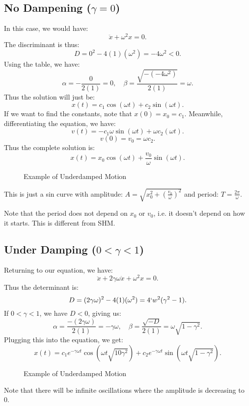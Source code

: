 \documentclass[../main/main.tex]{subfiles}
\begin{document}
\subsection{No Dampening ($\gamma=0$)} 
In this case, we would have: \[
	\ddot{x}+\omega^2x=0
.\] The discriminant is thus: \[
D=0^2-4(1)(\omega^2)=-4\omega^2<0
.\] Using the table, we have: \[
\alpha=-\frac{0}{2(1)}=0, \quad\beta = \frac{\sqrt{-(-4\omega^2)}}{2(1)} = \omega
.\] Thus the solution will just be: \[
x(t) = c_1\cos(\omega t)+c_2\sin(\omega t)
.\] If we want to find the constants, note that $x(0)=x_0=c_1$. Meanwhile, differentiating the equation, we have: \[
v(t) = -c_1\omega\sin(\omega t)+\omega c_2(\omega t) 
.\] \[
v(0)=v_0=\omega c_2
.\] Thus the complete solution is: \[
x(t) = x_0 \cos(\omega t) + \frac{v_0}{\omega}\sin(\omega t)
.\] 
\begin{figure}[h!]
	\centering
	\caption{ Example of Underdamped Motion}
	\label{fig:}
\end{figure}
This is just a sin curve with amplitude: $A=\sqrt{x_0^2+\left( \frac{v_0}{\omega} \right) ^2} $ and period: $T=\frac{2\pi}{\omega}$.
\begin{remark}
	Note that the period does not depend on $x_0$ or $v_0$, i.e. it doesn't depend on how it starts. This is different from SHM.
\end{remark}
\subsection{Under Damping ($0<\gamma<1$)}
Returning to our equation, we have: \[
	\ddot{x} + 2\gamma\omega \dot{x} + \omega^2x = 0
.\] Thus the determinant is: \[
D=(2\gamma\omega)^2-4(1)(\omega^2)=4`w^2(\gamma^2-1)
.\] If $0<\gamma<1$, we have $D<0$, giving us:  \[
\alpha = \frac{-(2\gamma\omega)}{2(1)}=-\gamma\omega,\quad \beta=\frac{\sqrt{-D} }{2(1)}=\omega\sqrt{1-\gamma^2} 
.\] Plugging this into the equation, we get: \[
x(t) = c_1 e^{-\gamma\omega t}\cos(\omega t\sqrt{10\gamma^2} ) +c_2 e^{-\gamma\omega t}\sin(\omega t\sqrt{1-\gamma^2} )
.\]
\begin{figure}[h!]
	\centering
	\caption{ Example of Underdamped Motion}
	\label{fig:}
\end{figure}
\begin{remark}
	Note that there will be infinite oscillations where the amplitude is decreasing to 0.
\end{remark}
\end{document}
